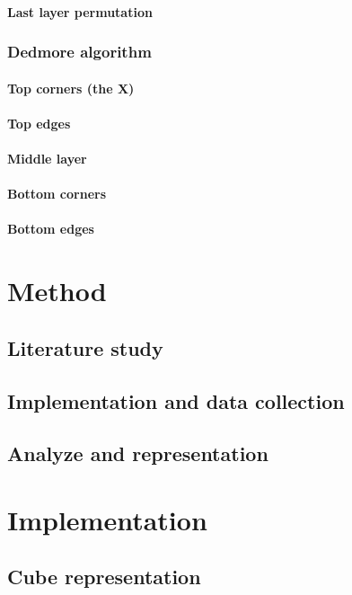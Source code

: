 \documentclass[a4paper,11pt]{kth-mag}
\begin{document}
\subsubsection{Last layer permutation}
\subsection{Dedmore algorithm}
\subsubsection{Top corners (the X)}
\subsubsection{Top edges}
\subsubsection{Middle layer}
\subsubsection{Bottom corners}
\subsubsection{Bottom edges}

\chapter{Method}

\section{Literature study}
\section{Implementation and data collection}
\section{Analyze and representation}


\chapter{Implementation}
\section{Cube representation}
\end{document}
